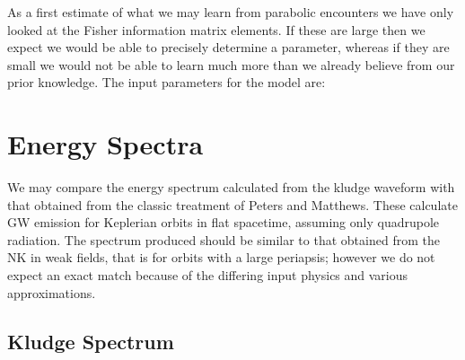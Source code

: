 \documentclass[a4paper, 11pt, titlepage, twoside]{report}
\begin{document}
As a first estimate of what we may learn from parabolic encounters we have only looked at the Fisher information matrix elements. If these are large then we expect we would be able to precisely determine a parameter, whereas if they are small we would not be able to learn much more than we already believe from our prior knowledge. The input parameters for the model are:

\section{Energy Spectra}

We may compare the energy spectrum calculated from the kludge waveform with that obtained from the classic treatment of Peters and Matthews\cite{Peters1963, Peters1964}. These calculate GW emission for Keplerian orbits in flat spacetime, assuming only quadrupole radiation. The spectrum produced should be similar to that obtained from the NK in weak fields, that is for orbits with a large periapsis; however we do not expect an exact match because of the differing input physics and various approximations.

\subsection{Kludge Spectrum}
\end{document}
